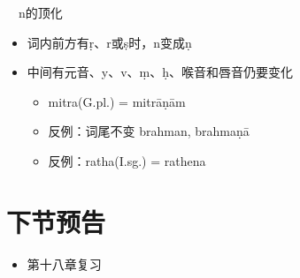 \documentclass[17pt]{beamer}
\begin{document}
\begin{frame}{\insertsection ~~n的顶化}
  \begin{itemize}
    \item 词内前方有ṛ、r或ṣ时，n变成ṇ
    \item 中间有元音、y、v、ṃ、ḥ、喉音和唇音仍要变化
    \begin{itemize}
      \item mitra(G.pl.) = mitrāṇām
      \item 反例：词尾不变 brahman, brahmaṇā
      \item 反例：ratha(I.sg.) = rathena 
    \end{itemize}
  \end{itemize}
\end{frame}



\section{下节预告}

\begin{frame}{\insertsection }
  \begin{itemize}
    \item
      第十八章复习
    
  \end{itemize}
\end{frame}  
\end{document}
